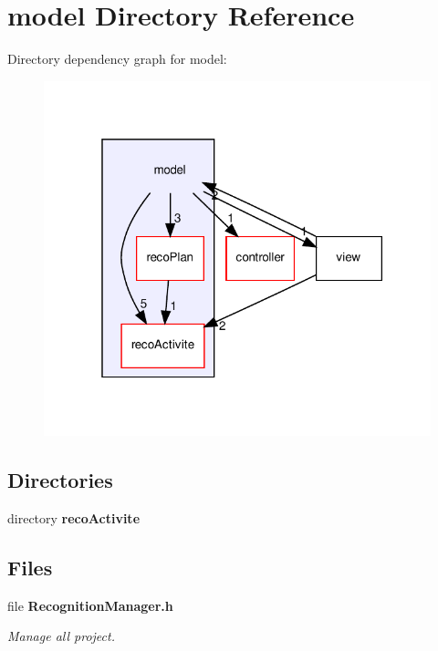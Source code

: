 \section{model Directory Reference}
\label{dir_3f14f6767c31cb4a1d22c13c18cc6fc3}
Directory dependency graph for model\+:
\nopagebreak
\begin{figure}[H]
\begin{center}
\leavevmode
\includegraphics[width=318pt]{dir_3f14f6767c31cb4a1d22c13c18cc6fc3_dep}
\end{center}
\end{figure}
\subsection*{Directories}
\begin{DoxyCompactItemize}
\item 
directory \textbf{ reco\+Activite}
\end{DoxyCompactItemize}
\subsection*{Files}
\begin{DoxyCompactItemize}
\item 
file \textbf{ Recognition\+Manager.\+h}
\begin{DoxyCompactList}\small\item\em Manage all project. \end{DoxyCompactList}\end{DoxyCompactItemize}
